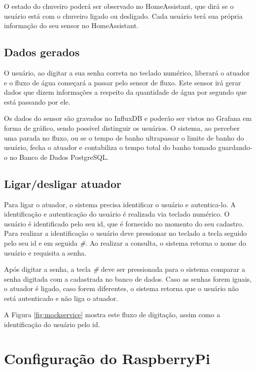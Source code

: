 O estado do chuveiro poderá ser observado no HomeAssistant, que dirá se o usuário está com o chuveiro ligado ou desligado. Cada usuário terá sua própria informação do seu sensor no HomeAssistant.

\subsection{Dados gerados}

O usuário, ao digitar a sua senha correta no teclado numérico, liberará o atuador e o fluxo de água começará a passar pelo sensor de fluxo. Este sensor irá gerar dados que dizem informações a respeito da quantidade de água por segundo que está passando por ele.

Os dados do sensor são gravados no InfluxDB e poderão ser vistos no Grafana em forma de gráfico, sendo possível distinguir os usuários. O sistema, ao perceber uma parada no fluxo, ou se o tempo de banho ultrapassar o limite de banho do usuário, fecha o atuador e contabiliza o tempo total do banho tomado guardando-o no Banco de Dados PostgreSQL.

\subsection{Ligar/desligar atuador}

Para ligar o atuador, o sistema precisa identificar o usuário e autentica-lo. A identificação e autenticação do usuário é realizada via teclado numérico. O usuário é identificado pelo seu id, que é fornecido no momento do seu cadastro. Para realizar a identificação o usuário deve pressionar no teclado a tecla \textit{\*} seguido pelo seu id e em seguida \textit{\#}. Ao realizar a consulta, o sistema retorna o nome do usuário e requisita a senha.

Após digitar a senha, a tecla \textit{\#} deve ser pressionada para o sistema comparar a senha digitada com a cadastrada no banco de dados. Caso as senhas forem iguais, o atuador é ligado, caso forem diferentes, o sistema retorna que o usuário não está autenticado e não liga o atuador. 

A Figura \ref{fig:mockservice} mostra este fluxo de digitação, assim como a identificação do usuário pelo id.

\section{Configuração do RaspberryPi}

